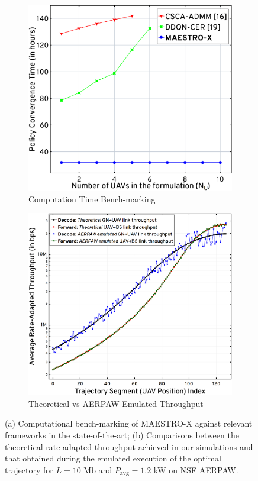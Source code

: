 \documentclass[10pt, twocolumn]{IEEEtran}
\theoremstyle{plain}
\theoremstyle{definition}
\theoremstyle{remark}
\begin{document}
\begin{figure}[t]
	\begin{subfigure}{0.494\linewidth}
  		\centering
  		\includegraphics[width=0.8\linewidth]{figs/Computational_Complexity.png}
  		\caption{Computation Time Bench-marking}
  		\label{F10}
	\end{subfigure}
	\begin{subfigure}{0.506\linewidth}
         \centering
         \includegraphics[width=0.8\linewidth]{figs/AERPAW_Emulated_Throughput_Comparisons.png}
         \caption{Theoretical vs AERPAW Emulated Throughput}
         \label{F11}
     \end{subfigure}
	\caption{(a) Computational bench-marking of MAESTRO-X against relevant frameworks in the state-of-the-art; (b) Comparisons between the theoretical rate-adapted throughput achieved in our simulations and that obtained during the emulated execution of the optimal trajectory for $L{=}10$ Mb and $P_{\text{avg}}{=}1.2$ kW on NSF AERPAW.}
	\vspace{-6mm}
\end{figure}
\end{document}
